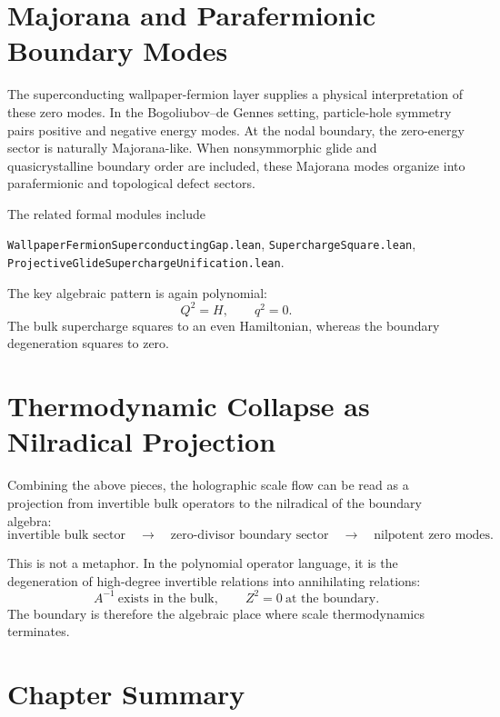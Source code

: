 \section{Majorana and Parafermionic Boundary Modes}

The superconducting wallpaper-fermion layer supplies a physical interpretation of these zero modes.  In the Bogoliubov--de Gennes setting, particle-hole symmetry pairs positive and negative energy modes.  At the nodal boundary, the zero-energy sector is naturally Majorana-like.  When nonsymmorphic glide and quasicrystalline boundary order are included, these Majorana modes organize into parafermionic and topological defect sectors.

The related formal modules include
\begin{center}
\texttt{WallpaperFermionSuperconductingGap.lean},\quad
\texttt{SuperchargeSquare.lean},\quad
\texttt{ProjectiveGlideSuperchargeUnification.lean}.
\end{center}
The key algebraic pattern is again polynomial:
\begin{equation}
    Q^2=H,
    \qquad
    q^2=0.
\end{equation}
The bulk supercharge squares to an even Hamiltonian, whereas the boundary degeneration squares to zero.

\section{Thermodynamic Collapse as Nilradical Projection}

Combining the above pieces, the holographic scale flow can be read as a projection from invertible bulk operators to the nilradical of the boundary algebra:
\begin{equation}
    \text{invertible bulk sector}
    \quad\longrightarrow\quad
    \text{zero-divisor boundary sector}
    \quad\longrightarrow\quad
    \text{nilpotent zero modes}.
\end{equation}

This is not a metaphor.  In the polynomial operator language, it is the degeneration of high-degree invertible relations into annihilating relations:
\begin{equation}
    A^{-1}\ \text{exists in the bulk},
    \qquad
    Z^2=0\ \text{at the boundary}.
\end{equation}
The boundary is therefore the algebraic place where scale thermodynamics terminates.

\section{Chapter Summary}


